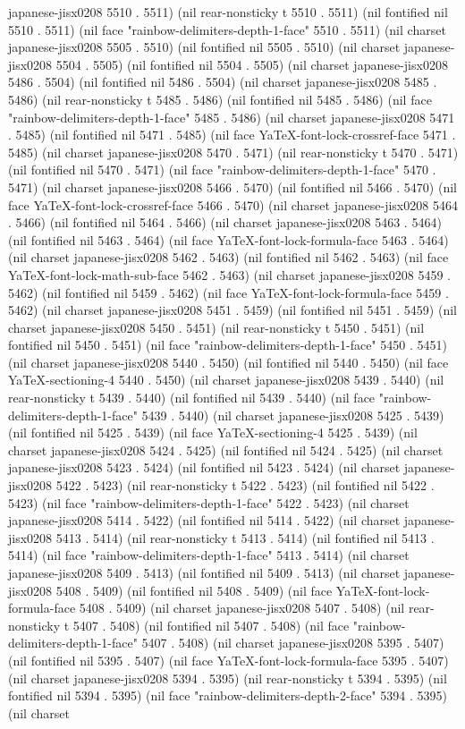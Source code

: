 japanese-jisx0208 5510 . 5511) (nil rear-nonsticky t 5510 . 5511) (nil fontified nil 5510 . 5511) (nil face "rainbow-delimiters-depth-1-face" 5510 . 5511) (nil charset japanese-jisx0208 5505 . 5510) (nil fontified nil 5505 . 5510) (nil charset japanese-jisx0208 5504 . 5505) (nil fontified nil 5504 . 5505) (nil charset japanese-jisx0208 5486 . 5504) (nil fontified nil 5486 . 5504) (nil charset japanese-jisx0208 5485 . 5486) (nil rear-nonsticky t 5485 . 5486) (nil fontified nil 5485 . 5486) (nil face "rainbow-delimiters-depth-1-face" 5485 . 5486) (nil charset japanese-jisx0208 5471 . 5485) (nil fontified nil 5471 . 5485) (nil face YaTeX-font-lock-crossref-face 5471 . 5485) (nil charset japanese-jisx0208 5470 . 5471) (nil rear-nonsticky t 5470 . 5471) (nil fontified nil 5470 . 5471) (nil face "rainbow-delimiters-depth-1-face" 5470 . 5471) (nil charset japanese-jisx0208 5466 . 5470) (nil fontified nil 5466 . 5470) (nil face YaTeX-font-lock-crossref-face 5466 . 5470) (nil charset japanese-jisx0208 5464 . 5466) (nil fontified nil 5464 . 5466) (nil charset japanese-jisx0208 5463 . 5464) (nil fontified nil 5463 . 5464) (nil face YaTeX-font-lock-formula-face 5463 . 5464) (nil charset japanese-jisx0208 5462 . 5463) (nil fontified nil 5462 . 5463) (nil face YaTeX-font-lock-math-sub-face 5462 . 5463) (nil charset japanese-jisx0208 5459 . 5462) (nil fontified nil 5459 . 5462) (nil face YaTeX-font-lock-formula-face 5459 . 5462) (nil charset japanese-jisx0208 5451 . 5459) (nil fontified nil 5451 . 5459) (nil charset japanese-jisx0208 5450 . 5451) (nil rear-nonsticky t 5450 . 5451) (nil fontified nil 5450 . 5451) (nil face "rainbow-delimiters-depth-1-face" 5450 . 5451) (nil charset japanese-jisx0208 5440 . 5450) (nil fontified nil 5440 . 5450) (nil face YaTeX-sectioning-4 5440 . 5450) (nil charset japanese-jisx0208 5439 . 5440) (nil rear-nonsticky t 5439 . 5440) (nil fontified nil 5439 . 5440) (nil face "rainbow-delimiters-depth-1-face" 5439 . 5440) (nil charset japanese-jisx0208 5425 . 5439) (nil fontified nil 5425 . 5439) (nil face YaTeX-sectioning-4 5425 . 5439) (nil charset japanese-jisx0208 5424 . 5425) (nil fontified nil 5424 . 5425) (nil charset japanese-jisx0208 5423 . 5424) (nil fontified nil 5423 . 5424) (nil charset japanese-jisx0208 5422 . 5423) (nil rear-nonsticky t 5422 . 5423) (nil fontified nil 5422 . 5423) (nil face "rainbow-delimiters-depth-1-face" 5422 . 5423) (nil charset japanese-jisx0208 5414 . 5422) (nil fontified nil 5414 . 5422) (nil charset japanese-jisx0208 5413 . 5414) (nil rear-nonsticky t 5413 . 5414) (nil fontified nil 5413 . 5414) (nil face "rainbow-delimiters-depth-1-face" 5413 . 5414) (nil charset japanese-jisx0208 5409 . 5413) (nil fontified nil 5409 . 5413) (nil charset japanese-jisx0208 5408 . 5409) (nil fontified nil 5408 . 5409) (nil face YaTeX-font-lock-formula-face 5408 . 5409) (nil charset japanese-jisx0208 5407 . 5408) (nil rear-nonsticky t 5407 . 5408) (nil fontified nil 5407 . 5408) (nil face "rainbow-delimiters-depth-1-face" 5407 . 5408) (nil charset japanese-jisx0208 5395 . 5407) (nil fontified nil 5395 . 5407) (nil face YaTeX-font-lock-formula-face 5395 . 5407) (nil charset japanese-jisx0208 5394 . 5395) (nil rear-nonsticky t 5394 . 5395) (nil fontified nil 5394 . 5395) (nil face "rainbow-delimiters-depth-2-face" 5394 . 5395) (nil charset 